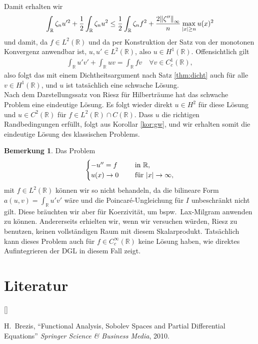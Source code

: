 \documentclass[twoside]{article}
\def\beginrefs{\begin{list}%
        {[\arabic{equation}]}{\usecounter{equation}
         \setlength{\leftmargin}{2.0truecm}\setlength{\labelsep}{0.4truecm}%
         \setlength{\labelwidth}{1.6truecm}}}
\def\endrefs{\end{list}}
\def\bibentry#1{\item[\hbox{[#1]}]}
\theoremstyle{definition}
\newtheorem{remark}[theorem]{Bemerkung}
\begin{document}
Damit erhalten wir
\begin{align*}
\int_\mathbb{R} \zeta_n u'^2 + \frac{1}{2}\int_\mathbb{R} \zeta_n u^2 \leq \frac{1}{2} \int_\mathbb{R} \zeta_n f^2 + \frac{2 \norm{\zeta''}_\infty}{n} \max_{\abs{x} \geq n} u(x)^2
\end{align*}
und damit, da $f \in L^2(\mathbb{R})$ und da per Konstruktion der Satz von der monotonen Konvergenz anwendbar ist, $u,u' \in L^2(\mathbb{R})$, also $u \in H^1(\mathbb{R})$. Offensichtlich gilt
\begin{align*}
\int_\mathbb{R} u' v'  + \int_\mathbb{R} uv = \int_\mathbb{R} fv \quad \forall v \in C^1_c(\mathbb{R}),
\end{align*}
also folgt das mit einem Dichtheitsargument nach Satz \ref{thm:dicht} auch für alle $v \in H^1(\mathbb{R})$, und $u$ ist tatsächlich eine schwache Lösung.\\

Nach dem Darstellungssatz von Riesz für Hilberträume hat das schwache Problem eine eindeutige Lösung. Es folgt wieder direkt $u \in H^2$ für diese Lösung und $u \in C^2(\mathbb{R})$ für $f \in L^2(\mathbb{R}) \cap C(\mathbb{R})$. Dass $u$ die richtigen Randbedingungen erfüllt, folgt  aus Korollar \ref{kor:gw}, und wir erhalten somit die eindeutige Lösung des klassischen Problems.
\begin{remark}
Das Problem
\begin{align}
\begin{cases}
-u'' = f &\quad \text{ in } \mathbb{R},\\
u(x) \to 0 &\quad \text{ für } \abs{x} \to \infty,
\end{cases} \label{eq:r2}
\end{align}
mit $f \in L^2(\mathbb{R})$ können wir so nicht behandeln, da die bilineare Form $a(u,v)=\int_\mathbb{R} u'v'$ wäre und die Poincar{\'e}-Ungleichung für $I$ unbeschränkt nicht gilt. Diese bräuchten wir aber für Koerzivität, um bspw.\ Lax-Milgram anwenden zu können. Andererseits erhielten wir, wenn wir versuchen würden, Riesz zu benutzen, keinen vollständigen Raum mit diesem Skalarprodukt. Tatsächlich kann dieses Problem auch für $f \in C_c^\infty(\mathbb{R})$ keine Lösung haben, wie direktes Aufintegrieren der DGL in diesem Fall zeigt.
\end{remark}
\section*{Literatur}
\beginrefs
\bibentry{1}{\sc H.~Brezis}, 
``Functional Analysis, Sobolev Spaces and Partial Differential Equations''
{\it Springer Science \& Business Media},
2010.
\endrefs
\end{document}
